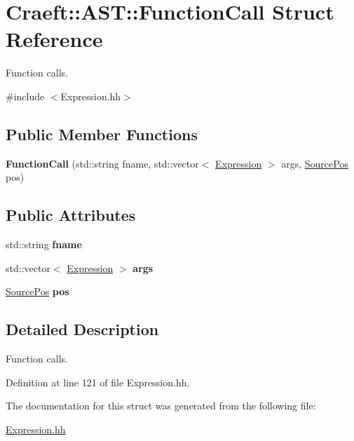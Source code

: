 \hypertarget{struct_craeft_1_1_a_s_t_1_1_function_call}{}\section{Craeft\+:\+:A\+ST\+:\+:Function\+Call Struct Reference}
\label{struct_craeft_1_1_a_s_t_1_1_function_call}


Function calls.  




{\ttfamily \#include $<$Expression.\+hh$>$}

\subsection*{Public Member Functions}
\begin{DoxyCompactItemize}
\item 
\hypertarget{struct_craeft_1_1_a_s_t_1_1_function_call_a58f4f65e86b7ae1162132d9bdfc7cda4}{}\label{struct_craeft_1_1_a_s_t_1_1_function_call_a58f4f65e86b7ae1162132d9bdfc7cda4} 
{\bfseries Function\+Call} (std\+::string fname, std\+::vector$<$ \hyperlink{_expression_8hh_aef28cabf6d8e7cb8324232e27e69606d}{Expression} $>$ args, \hyperlink{struct_craeft_1_1_source_pos}{Source\+Pos} pos)
\end{DoxyCompactItemize}
\subsection*{Public Attributes}
\begin{DoxyCompactItemize}
\item 
\hypertarget{struct_craeft_1_1_a_s_t_1_1_function_call_aeec640c9e76dcf9535fcebc5ceb86417}{}\label{struct_craeft_1_1_a_s_t_1_1_function_call_aeec640c9e76dcf9535fcebc5ceb86417} 
std\+::string {\bfseries fname}
\item 
\hypertarget{struct_craeft_1_1_a_s_t_1_1_function_call_a4f96ccf063fdb97b846ed84381bb6357}{}\label{struct_craeft_1_1_a_s_t_1_1_function_call_a4f96ccf063fdb97b846ed84381bb6357} 
std\+::vector$<$ \hyperlink{_expression_8hh_aef28cabf6d8e7cb8324232e27e69606d}{Expression} $>$ {\bfseries args}
\item 
\hypertarget{struct_craeft_1_1_a_s_t_1_1_function_call_a1f4d2de6af42eb28db5a2a9557155afb}{}\label{struct_craeft_1_1_a_s_t_1_1_function_call_a1f4d2de6af42eb28db5a2a9557155afb} 
\hyperlink{struct_craeft_1_1_source_pos}{Source\+Pos} {\bfseries pos}
\end{DoxyCompactItemize}


\subsection{Detailed Description}
Function calls. 

Definition at line 121 of file Expression.\+hh.



The documentation for this struct was generated from the following file\+:\begin{DoxyCompactItemize}
\item 
\hyperlink{_expression_8hh}{Expression.\+hh}\end{DoxyCompactItemize}
